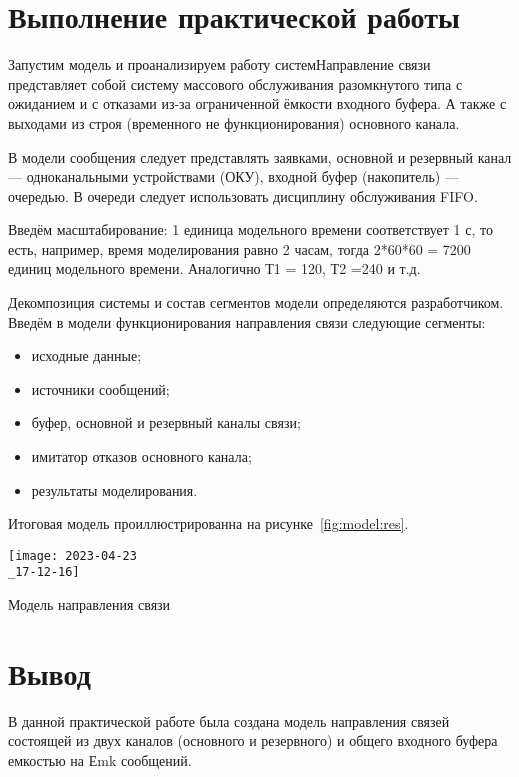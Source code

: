 \section*{\LARGE Выполнение практической работы}
Запустим модель и проанализируем работу системНаправление связи
представляет собой систему массового обслуживания разомкнутого типа с
ожиданием и с отказами из-за ограниченной ёмкости входного буфера. А также
с выходами из строя (временного не функционирования) основного канала.\par
В модели сообщения следует представлять заявками, основной
и резервный канал — одноканальными устройствами (ОКУ), 
входной буфер (накопитель) — очередью. В очереди следует
использовать дисциплину обслуживания FIFO.\par
Введём масштабирование: 1 единица модельного времени
соответствует 1 с, то есть, например, время моделирования равно 2
часам, тогда 2*60*60 = 7200 единиц модельного времени.
Аналогично Т1 = 120, Т2 =240 и т.д.\par
Декомпозиция системы и состав сегментов модели
определяются разработчиком. Введём в модели
функционирования направления связи следующие сегменты:

\begin{itemize}
	\item исходные данные;
	\item источники сообщений;
	\item буфер, основной и резервный каналы связи;
	\item имитатор отказов основного канала;
	\item результаты моделирования.
\end{itemize}

Итоговая модель проиллюстрированна на рисунке~\ref{fig:model:res}.

\begin{image}
	\texttt{[image: 2023-04-23\\\_17-12-16]}
	\caption{Модель направления связи}
	\label{fig:model:res}
\end{image}

\clearpage

\section*{\LARGE Вывод}
В данной практической работе была создана модель направления связей
состоящей из двух каналов (основного и резервного) и общего входного
буфера емкостью на Еmk сообщений.

